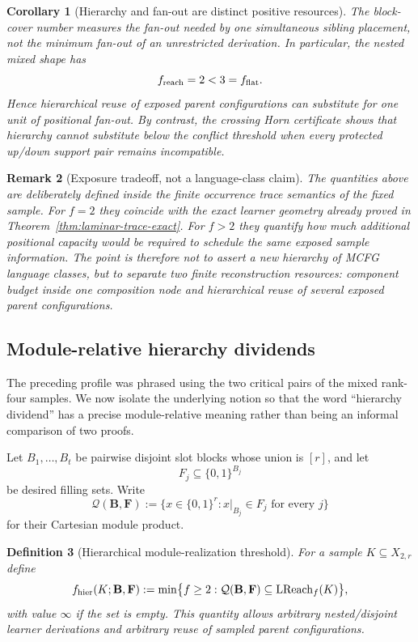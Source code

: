 \documentclass[11pt]{article}
\newtheorem{definition}{Definition}[section]
\newtheorem{corollary}[definition]{Corollary}
\newtheorem{remark}[definition]{Remark}
\begin{document}
\begin{corollary}[Hierarchy and fan-out are distinct positive resources]
\label{cor:hierarchy-fanout-distinct}
The block-cover number measures the fan-out needed by one simultaneous sibling
placement, not the minimum fan-out of an unrestricted derivation.  In
particular, the nested mixed shape has
\[
  f_{\rm reach}=2<3=f_{\rm flat}.
\]
Hence hierarchical reuse of exposed parent configurations can substitute for
one unit of positional fan-out.  By contrast, the crossing Horn certificate
shows that hierarchy cannot substitute below the conflict threshold when every
protected up/down support pair remains incompatible.
\end{corollary}

\begin{remark}[Exposure tradeoff, not a language-class claim]
The quantities above are deliberately defined inside the finite occurrence
trace semantics of the fixed sample.  For $f=2$ they coincide with the exact
learner geometry already proved in Theorem~\ref{thm:laminar-trace-exact}.  For
$f>2$ they quantify how much additional positional capacity would be required
to schedule the same exposed sample information.  The point is therefore not
to assert a new hierarchy of MCFG language classes, but to separate two finite
reconstruction resources: component budget inside one composition node and
hierarchical reuse of several exposed parent configurations.
\end{remark}

\subsection{Module-relative hierarchy dividends}
\label{subsec:module-hierarchy-dividend}

The preceding profile was phrased using the two critical pairs of the mixed
rank-four samples.  We now isolate the underlying notion so that the word
``hierarchy dividend'' has a precise module-relative meaning rather than being
an informal comparison of two proofs.

Let $B_1,\ldots,B_t$ be pairwise disjoint slot blocks whose union is $[r]$, and
let
\[
  F_j\subseteq\{0,1\}^{B_j}
\]
be desired filling sets.  Write
\[
  \mathcal Q(\mathbf B,\mathbf F)
  :=\{x\in\{0,1\}^r:x|_{B_j}\in F_j\text{ for every }j\}
\]
for their Cartesian module product.

\begin{definition}[Hierarchical module-realization threshold]
\label{def:module-hier-threshold}
For a sample $K\subseteq X_{2,r}$ define
\[
 f_{\rm hier}(K;\mathbf B,\mathbf F)
 :=\min\bigl\{f\ge2:
      \mathcal Q(\mathbf B,\mathbf F)
      \subseteq\operatorname{LReach}_f(K)\bigr\},
\]
with value $\infty$ if the set is empty.  This quantity allows arbitrary
nested/disjoint learner derivations and arbitrary reuse of sampled parent
configurations.
\end{definition}
\end{document}
